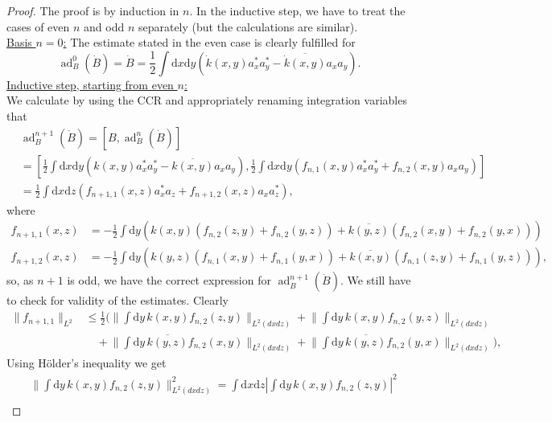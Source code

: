 \documentclass[11pt,a4paper,draft,DIV11]{scrartcl}	%
\newcommand{\ad}{\operatorname{ad}}	%
\newcommand{\di}{\textrm{d}}		%
\newcommand{\cc}[1]{\overline{#1}}	%
\newcommand{\norm}[1]{\lVert#1\rVert}	%
\newcommand{\be}[1]{\begin{equation}\label{eq:#1}}	%
\newcommand{\ee}{\end{equation}}
\newcommand{\bd}{\begin{displaymath}}			%
\newcommand{\ed}{\end{displaymath}}
\begin{document}
\begin{proof} The proof is by induction in $n$. In the inductive step, we have to treat the cases of even $n$ and odd $n$ separately (but the calculations are similar).\\
\underline{Basis $n=0$:} The estimate stated in the even case is clearly fulfilled for
\bd
\ad^0_B(\dot B) = \dot B = \frac{1}{2}\int \di x\di y\left( \dot k(x,y) a^\ast_x a^\ast_y - \cc{\dot k(x,y)} a_x a_y \right).
\ed
\underline{Inductive step, starting from even $n$:}\\
We calculate by using the CCR and appropriately renaming integration variables that
\begin{align*}
& \ad^{n+1}_B(\dot B) = [B,\ad^n_B(\dot B)] \\
& = \left[\frac{1}{2} \int \di x\di y\left( k(x,y)a^\ast_x a^\ast_y - \cc{k(x,y)}a_x a_y \right), \frac{1}{2}\int \di x\di y\left( f_{n,1}(x,y) a^\ast_x a^\ast_y + f_{n,2}(x,y) a_x a_y \right)\right] \\
& = \frac{1}{2} \int \di x\di z \left(f_{n+1,1}(x,z) a^\ast_x a_z + f_{n+1,2}(x,z) a_x a^\ast_z \right),
\end{align*}
where
\begin{equation}
\label{eq:even}
\begin{split}
f_{n+1,1}(x,z) & = -\frac{1}{2} \int \di y \left( k(x,y) \left( f_{n,2}(z,y) + f_{n,2}(y,z) \right) + \cc{k(y,z)}\left( f_{n,2}(x,y) + f_{n,2}(y,x)\right) \right)\\
f_{n+1,2}(x,z) & = -\frac{1}{2} \int \di y \left( k(y,z) \left( f_{n,1}(x,y) + f_{n,1}(y,x) \right) + \cc{k(x,y)}\left( f_{n,1}(z,y) + f_{n,1}(y,z)\right) \right), 
\end{split}
\end{equation}
so, as $n+1$ is odd, we have the correct expression for $\ad^{n+1}_B(\dot B)$. We still have to check for validity of the estimates.
Clearly
\be{normnorm}
\begin{split}
\norm{f_{n+1,1}}_{L^2} & \leq \frac{1}{2} \bigg( \norm{\int \di y\, k(x,y) f_{n,2}(z,y)}_{L^2(dxdz)} + \norm{\int \di y\, k(x,y) f_{n,2}(y,z)}_{L^2(dxdz)} \\
& \quad + \norm{\int \di y\, \cc{k(y,z)}f_{n,2}(x,y)}_{L^2(dxdz)} + \norm{\int \di y\, \cc{k(y,z)} f_{n,2}(y,x)}_{L^2(dxdz)} \bigg),
\end{split}
\ee
Using H\"older's inequality we get
\begin{align*}
& \norm{\int \di y\,k(x,y) f_{n,2}(z,y)}^2_{L^2(dxdz)} = \int \di x\di z \left\lvert \int \di y\,k(x,y) f_{n,2}(z,y) \right\rvert^2 \\

\end{align*}
\end{proof}
\end{document}
